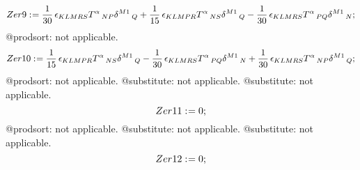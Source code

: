 \documentclass[11pt]{article}
\def\specialcolon{\mathrel{\mathop{:}}\hspace{-.5em}}
\begin{document}
\begin{dmath*}[compact, spread=2pt]
Zer9\specialcolon{}= \frac{1}{30}\, {\epsilon}_{K L M R S} {T}^{\alpha}\,_{N P} {\delta}^{M1}\,_{Q} + \frac{1}{15}\, {\epsilon}_{K L M P R} {T}^{\alpha}\,_{N S} {\delta}^{M1}\,_{Q} - \frac{1}{30}\, {\epsilon}_{K L M R S} {T}^{\alpha}\,_{P Q} {\delta}^{M1}\,_{N};
\end{dmath*}
@prodsort: not applicable.
\begin{dmath*}[compact, spread=2pt]
Zer10\specialcolon{}= \frac{1}{15}\, {\epsilon}_{K L M P R} {T}^{\alpha}\,_{N S} {\delta}^{M1}\,_{Q} - \frac{1}{30}\, {\epsilon}_{K L M R S} {T}^{\alpha}\,_{P Q} {\delta}^{M1}\,_{N} + \frac{1}{30}\, {\epsilon}_{K L M R S} {T}^{\alpha}\,_{N P} {\delta}^{M1}\,_{Q};
\end{dmath*}
@prodsort: not applicable.
@substitute: not applicable.
@substitute: not applicable.
\begin{dmath*}[compact, spread=2pt]
Zer11\specialcolon{}= 0;
\end{dmath*}
@prodsort: not applicable.
@substitute: not applicable.
@substitute: not applicable.
\begin{dmath*}[compact, spread=2pt]
Zer12\specialcolon{}= 0;
\end{dmath*}
\end{document}
